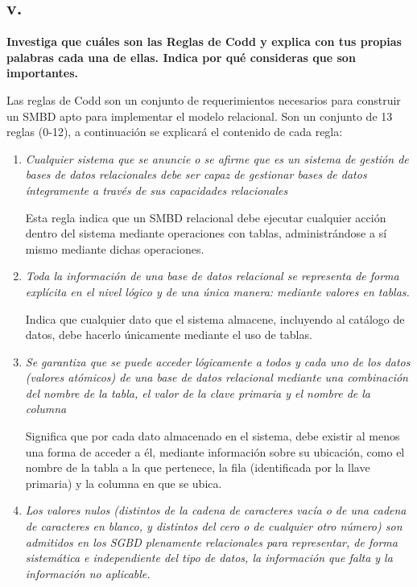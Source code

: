 \subsection*{v. }

    
\textbf{Investiga que cuáles son las Reglas de Codd y explica con tus propias palabras cada una de ellas. Indica por qué consideras que son importantes.}

Las reglas de Codd son un conjunto de requerimientos necesarios para construir un SMBD apto para implementar el modelo relacional. Son un conjunto de 13 reglas (0-12), a continuación se explicará el contenido de cada regla:
\begin{enumerate}[start=0]
    \item \textit{Cualquier sistema que se anuncie o se afirme que es un sistema de gestión de bases de datos relacionales debe ser capaz de gestionar bases de datos íntegramente a través de sus capacidades
    relacionales} \cite{Codd1985}

    Esta regla indica que un SMBD relacional debe ejecutar cualquier acción dentro del sistema mediante operaciones con tablas, administrándose a sí mismo mediante dichas operaciones.    
        
    \item \textit{Toda la información de una base de datos relacional se representa de forma explícita en el nivel lógico y de una única manera: mediante valores en tablas.}\cite{Codd1985}

    Indica que cualquier dato que el sistema almacene, incluyendo al catálogo de datos, debe hacerlo únicamente mediante el uso de tablas.
    
    \item \textit{Se garantiza que se puede acceder lógicamente a todos y cada uno de los datos (valores atómicos) de una base de datos relacional mediante una combinación del nombre de la tabla, el valor de la clave primaria y el nombre de la columna}\cite{Codd1985}
    
    Significa que por cada dato almacenado en el sistema, debe existir al menos una forma de acceder a él, mediante información sobre su ubicación, como el nombre de la tabla a la que pertenece, la fila (identificada por la llave primaria) y la columna en que se ubica.
    
    \item \textit{Los valores nulos (distintos de la cadena de caracteres vacía o de una cadena de caracteres en blanco, y distintos del cero o de cualquier otro número) son admitidos en los SGBD plenamente relacionales para representar, de forma sistemática e independiente del tipo de datos, la información que falta y la información no aplicable.}\cite{Codd1985}


\end{enumerate}
